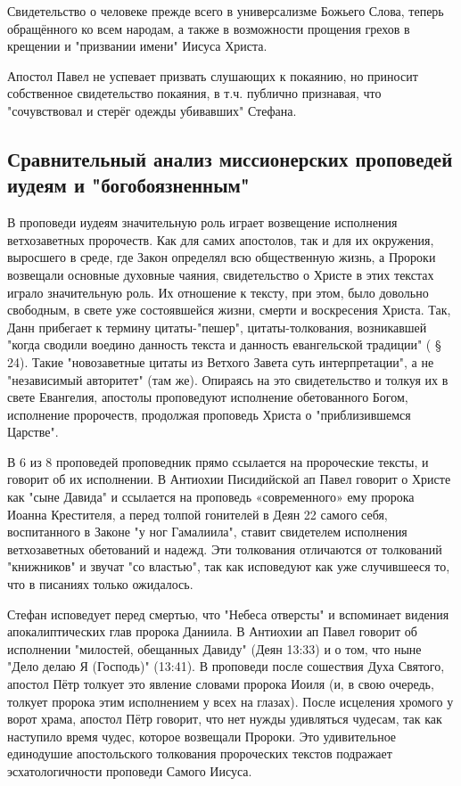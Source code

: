 Свидетельство о человеке прежде всего в универсализме Божьего Слова, теперь обращённого ко всем народам, а также в возможности прощения грехов в крещении и "призвании имени" Иисуса Христа.

Апостол Павел не успевает призвать слушающих к покаянию, но приносит собственное свидетельство покаяния, в т.ч. публично признавая, что "сочувствовал и стерёг одежды убивавших" Стефана.

\subsection*{Сравнительный анализ миссионерских проповедей иудеям и "богобоязненным"}

В проповеди иудеям значительную роль играет возвещение исполнения ветхозаветных пророчеств.
Как для самих апостолов, так и для их окружения, выросшего в среде, где Закон определял всю общественную жизнь, а Пророки возвещали основные духовные чаяния, свидетельство о Христе в этих текстах играло значительную роль.
Их отношение к тексту, при этом, было довольно свободным, в свете уже состоявшейся жизни, смерти и воскресения Христа.
Так, Данн прибегает к термину цитаты-"пешер", цитаты-толкования, возникавшей "когда сводили воедино данность текста и данность евангельской традиции" (\cite{@dunn.edinstvo} § 24).
Такие "новозаветные цитаты из Ветхого Завета суть интерпретации", а не "независимый авторитет" (там же).
Опираясь на это свидетельство и толкуя их в свете Евангелия, апостолы проповедуют исполнение обетованного Богом, исполнение пророчеств, продолжая проповедь Христа о "приблизившемся Царстве".


В 6 из 8 проповедей проповедник прямо ссылается на пророческие тексты, и говорит об их исполнении.
В Антиохии Писидийской ап Павел говорит о Христе как "сыне Давида" и ссылается на проповедь «современного» ему пророка Иоанна Крестителя, а перед толпой гонителей в Деян 22 самого себя, воспитанного в Законе "у ног Гамалиила", ставит свидетелем исполнения ветхозаветных обетований и надежд.
Эти толкования отличаются от толкований "книжников" и звучат "со властью", так как исповедуют как уже случившееся то, что в писаниях только ожидалось.


Стефан исповедует перед смертью, что "Небеса отверсты" и вспоминает видения апокалиптических глав пророка Даниила.
В Антиохии ап Павел говорит об исполнении "милостей, обещанных Давиду" (Деян 13:33) и о том, что ныне "Дело делаю Я (Господь)" (13:41).
В проповеди после сошествия Духа Святого, апостол Пётр толкует это явление словами пророка Иоиля (и, в свою очередь, толкует пророка этим исполнением у всех на глазах).
После исцеления хромого у ворот храма, апостол Пётр говорит, что нет нужды удивляться чудесам, так как наступило время чудес, которое возвещали Пророки.
Это удивительное единодушие апостольского толкования пророческих текстов подражает эсхатологичности проповеди Самого Иисуса.


